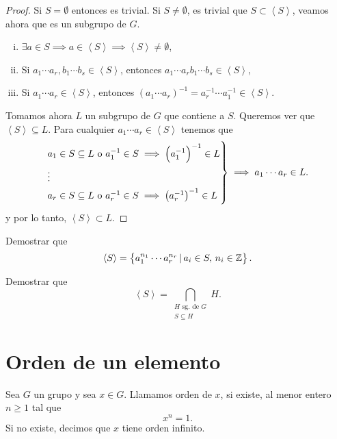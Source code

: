 \begin{proof}
    Si $S = \emptyset$ entonces es trivial.
    Si $S \neq \emptyset$, es trivial que $S \subset \left<S\right>$, veamos ahora que es un subgrupo de $G$.
    \begin{enumerate}[i)]
        \item $\exists a \in S \implies a \in \left<S\right> \implies \left<S\right> \neq \emptyset$,
        \item Si $a_1\cdots a_r, b_1 \cdots b_s \in \left<S\right>$, entonces $a_1 \cdots a_r b_1 \cdots b_s \in \left<S\right>$,
        \item Si $a_1 \cdots a_r \in \left<S\right>$, entonces $\left( a_1 \cdots a_r \right)^{-1} =
            a^{-1}_r \cdots a^{-1}_1 \in \left<S\right>$.
    \end{enumerate}
    Tomamos ahora $L$ un subgrupo de $G$ que contiene a $S$. Queremos ver que $\left<S\right> \subseteq L$.
    Para cualquier $a_1 \cdots a_r \in \left<S\right>$ tenemos que
    \[
        \begin{rcases}
            a_1 \in S \subseteq L \text{ o } a^{-1}_1 \in S \implies \left( a^{-1}_1 \right)^{-1} \in L\\
            \vdots \\
            a_r \in S \subseteq L\text{ o } a^{-1}_r \in S \implies \left( a^{-1}_r \right)^{-1} \in L
        \end{rcases}
        \implies a_1 \cdots a_r \in L.
    \]
    y por lo tanto, $\left<S\right> \subset L$.
\end{proof}

\begin{ej}
    Demostrar que
    \[
        \left<S\right> = \left\{a^{n_1}_1 \cdots a^{n_r}_r \,\vert\, a_i \in S, \, n_i \in \mathbb{Z}\right\}.
    \]
\end{ej}

\begin{ej}
    Demostrar que
    \[
        \left<S\right> = \bigcap_{\substack{H \text{ sg. de } G \\ S \subseteq H}} H.
    \]
\end{ej}

\section{Orden de un elemento}

\begin{defi}
    Sea $G$ un grupo y sea $x \in G$. Llamamos orden de $x$, si existe, al menor entero $n \geq 1$ tal que
    \[
        x^n = 1.
    \]
    Si no existe, decimos que $x$ tiene orden infinito.
\end{defi}


